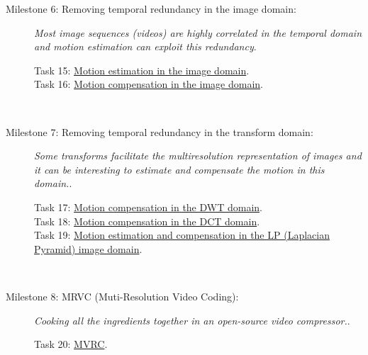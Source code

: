 \begin{description}
\item [Milestone 6: {\normalfont Removing temporal redundancy in
    the image domain:}] \emph{Most image sequences (videos) are highly
correlated in the temporal domain and motion estimation can exploit
this redundancy}.
  \begin{description}
  \item [Task 15: {\normalfont
      \href{https://sistemas-multimedia.github.io/contents/motion_estimation/}{Motion
        estimation in the image domain}.}]
  \item [Task 16: {\normalfont
      \href{https://sistemas-multimedia.github.io/contents/motion_compensation/}{Motion
        compensation in the image domain}.}]
  \end{description}
  ~\newline

\item [Milestone 7: {\normalfont Removing temporal redundancy in the
    transform domain:}] \emph{Some transforms facilitate the
multiresolution representation of images and it can be interesting to
estimate and compensate the motion in this domain.}.
  \begin{description}
  \item [Task 17: {\normalfont
      \href{https://sistemas-multimedia.github.io/contents/ME_MC_in_DWT_domain/}{Motion
        compensation in the DWT domain}.}]
  \item [Task 18: {\normalfont
      \href{https://sistemas-multimedia.github.io/contents/ME_MC_in_DCT_domain/}{Motion
        compensation in the DCT domain}.}]
  \item [Task 19: {\normalfont
      \href{https://sistemas-multimedia.github.io/contents/ME_MC_in_LP_domain/}{Motion
        estimation and compensation in the LP (Laplacian Pyramid) image domain}.}]
  \end{description}
  ~\newline

\item [Milestone 8: {\normalfont MRVC (Muti-Resolution Video
    Coding):}] \emph{Cooking all the ingredients together in an
open-source video compressor.}.
  \begin{description}
  \item [Task 20: {\normalfont
      \href{https://github.com/Sistemas-Multimedia/MRVC}{MVRC}.}]
  \end{description}
  \begin{comment}


\end{comment}
\end{description}

